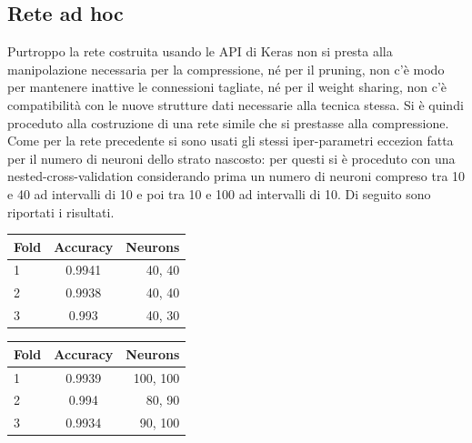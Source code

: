 \documentclass[12pt]{report}
\begin{document}
\subsection{Rete ad hoc}
Purtroppo la rete costruita usando le API di Keras non si presta alla manipolazione necessaria per la compressione, né per il pruning, non c’è modo per mantenere inattive le connessioni tagliate, né per il weight sharing, non c’è compatibilità con le nuove strutture dati necessarie alla tecnica stessa.
Si è quindi proceduto alla costruzione di una rete simile che si prestasse alla compressione. Come per la rete precedente si sono usati gli stessi iper-parametri eccezion fatta per il numero di neuroni dello strato nascosto: per questi si è proceduto con una nested-cross-validation considerando prima un numero di neuroni compreso tra 10 e 40 ad intervalli di 10 e poi tra 10 e 100 ad intervalli di 10.
Di seguito sono riportati i risultati.

\par\null\par

\begin{center}
\begin{tabular}{lcr}
\toprule
Fold & Accuracy & Neurons \\
\midrule
1  & 0.9941 & 40, 40\\
2  & 0.9938 & 40, 40\\
3  & 0.993 & 40, 30\\
\bottomrule
\end{tabular}
\end{center}

\par\null\par

\begin{center}
\begin{tabular}{lcr}
\toprule
Fold & Accuracy & Neurons \\
\midrule
1  & 0.9939 & 100, 100\\
2  & 0.994 & 80, 90\\
3  & 0.9934 & 90, 100\\
\bottomrule
\end{tabular}
\end{center}
\end{document}
